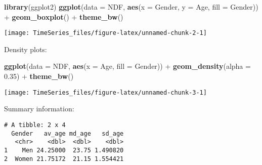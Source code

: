 \documentclass[]{article}
\newenvironment{Shaded}{\begin{snugshade}}{\end{snugshade}}
\newcommand{\KeywordTok}[1]{\textcolor[rgb]{0.13,0.29,0.53}{\textbf{{#1}}}}
\newcommand{\DataTypeTok}[1]{\textcolor[rgb]{0.13,0.29,0.53}{{#1}}}
\newcommand{\FloatTok}[1]{\textcolor[rgb]{0.00,0.00,0.81}{{#1}}}
\newcommand{\StringTok}[1]{\textcolor[rgb]{0.31,0.60,0.02}{{#1}}}
\newcommand{\NormalTok}[1]{{#1}}
\begin{document}
\begin{Shaded}
\begin{Highlighting}[]
\KeywordTok{library}\NormalTok{(ggplot2)}
\KeywordTok{ggplot}\NormalTok{(}\DataTypeTok{data =} \NormalTok{NDF, }\KeywordTok{aes}\NormalTok{(}\DataTypeTok{x =} \NormalTok{Gender, }\DataTypeTok{y =} \NormalTok{Age, }\DataTypeTok{fill =} \NormalTok{Gender)) +}\StringTok{ }\KeywordTok{geom_boxplot}\NormalTok{() +}\StringTok{ }
\StringTok{  }\KeywordTok{theme_bw}\NormalTok{()}
\end{Highlighting}
\end{Shaded}

\begin{center}\texttt{[image: TimeSeries\_files/figure-latex/unnamed-chunk-2-1]} \end{center}

Density plots:

\begin{Shaded}
\begin{Highlighting}[]
\KeywordTok{ggplot}\NormalTok{(}\DataTypeTok{data =} \NormalTok{NDF, }\KeywordTok{aes}\NormalTok{(}\DataTypeTok{x =} \NormalTok{Age, }\DataTypeTok{fill =} \NormalTok{Gender)) +}\StringTok{ }
\StringTok{  }\KeywordTok{geom_density}\NormalTok{(}\DataTypeTok{alpha =} \FloatTok{0.35}\NormalTok{) +}\StringTok{ }
\StringTok{  }\KeywordTok{theme_bw}\NormalTok{()}
\end{Highlighting}
\end{Shaded}

\begin{center}\texttt{[image: TimeSeries\_files/figure-latex/unnamed-chunk-3-1]} \end{center}

Summary information:

\begin{Shaded}
\end{Shaded}

\begin{verbatim}
# A tibble: 2 x 4
  Gender   av_age md_age   sd_age
   <chr>    <dbl>  <dbl>    <dbl>
1    Men 24.25000  23.75 1.490820
2  Women 21.75172  21.15 1.554421
\end{verbatim}
\end{document}
